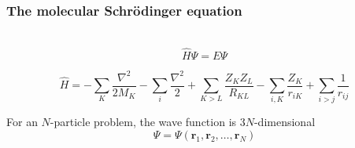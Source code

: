 
\begin{frame}
    \frametitle{The molecular Schr\"{o}dinger equation}
    \ \\
    {\large
    \begin{equation}
	\nonumber
	\hat{H}\Psi = E\Psi
    \end{equation}
    }

    \begin{equation}
	\nonumber
	\hat{H} =
        - \sum_K \frac{\nabla^2}{2M_K} - \sum_i \frac{\nabla^2}{2}
	+ \sum_{K>L} \frac{Z_K Z_L}{R_{KL}} 
	- \sum_{i,K} \frac{Z_K}{r_{iK}} 
	+ \sum_{i>j} \frac{1}{r_{ij}} 
    \end{equation}

    \vspace{5mm}

    \centering
    For an $N$-particle problem, the wave function is $3N$-dimensional
    \begin{equation}
	\nonumber
	\Psi = \Psi(\boldsymbol{r}_1,\boldsymbol{r}_2,\dots,\boldsymbol{r}_N)
    \end{equation}

    \vspace{5mm}


\end{frame}
